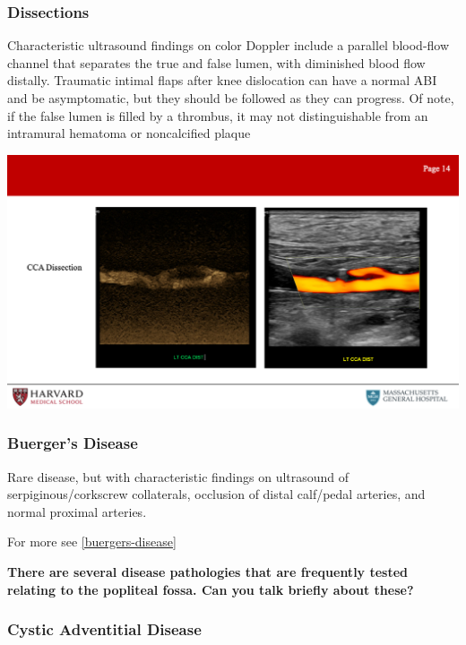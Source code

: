 \documentclass[
]{book}
\begin{document}
\hypertarget{dissections}{%
\subsubsection{Dissections}\label{dissections}}

Characteristic ultrasound findings on color Doppler include a parallel
blood-flow channel that separates the true and false lumen, with
diminished blood flow distally.\citep{ge2015, kobayashi2018} Traumatic
intimal flaps after knee dislocation can have a normal ABI and be
asymptomatic, but they should be followed as they can
progress.\citep{gaitini2008} Of note, if the false lumen is filled by a
thrombus, it may not distinguishable from an intramural hematoma or
noncalcified plaque

\includegraphics[width=15.01in]{images/vasc_lab2/Slide15}

\hypertarget{buerger}{%
\subsubsection{Buerger's Disease}\label{buerger}}

Rare disease, but with characteristic findings on ultrasound of
serpiginous/corkscrew collaterals, occlusion of distal calf/pedal
arteries, and normal proximal arteries.\citep{busch2011, fujii2011}

For more see \ref{buergers-disease}

\textbf{There are several disease pathologies that are frequently tested
relating to the popliteal fossa. Can you talk briefly about these?}

\hypertarget{cad}{%
\subsubsection{\texorpdfstring{\textbf{Cystic Adventitial Disease}}{Cystic Adventitial Disease}}\label{cad}}
\end{document}
